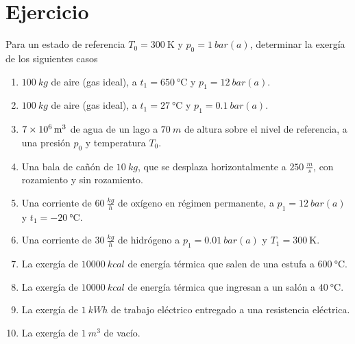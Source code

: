\section{Ejercicio}\label{ej:Chap08Ejercicio02}
Para un estado de referencia $T_0=\SI{300}{\kelvin}$ y $p_0=\SI{1}{bar(a)}$, determinar la exergía de los siguientes casos
\begin{enumerate}
    \item $\SI{100}{kg}$ de aire (gas ideal), a $t_1=\SI{650}{\celsius}$ y $p_1=\SI{12}{bar(a)}$.
    \item $\SI{100}{kg}$ de aire (gas ideal), a $t_1=\SI{27}{\celsius}$ y $p_1=\SI{0.1}{bar(a)}$.
    \item $\SI{7d6}{m^3}$ de agua de un lago a $\SI{70}{m}$ de altura sobre el nivel de referencia, a una presión $p_0$ y temperatura $T_0$.
    \item Una bala de cañón de $\SI{10}{kg}$, que se desplaza horizontalmente a $\SI{250}{\frac{m}{s}}$, con rozamiento y sin rozamiento.
    \item Una corriente de $\SI{60}{\frac{kg}{h}}$ de oxígeno en régimen permanente, a $p_1=\SI{12}{bar(a)}$ y $t_1=\SI{-20}{\celsius}$.
    \item Una corriente de $\SI{30}{\frac{kg}{h}}$ de hidrógeno a $p_1=\SI{0.01}{bar(a)}$ y $T_1=\SI{300}{\kelvin}$.
    \item La exergía de $\SI{10000}{kcal}$ de energía térmica que salen de una estufa a $\SI{600}{\celsius}$.
    \item La exergía de $\SI{10000}{kcal}$ de energía térmica que ingresan a un salón a $\SI{40}{\celsius}$.
    \item La exergía de $\SI{1}{kWh}$ de trabajo eléctrico entregado a una resistencia eléctrica.
    \item La exergía de $\SI{1}{m^3}$ de vacío.
\end{enumerate}